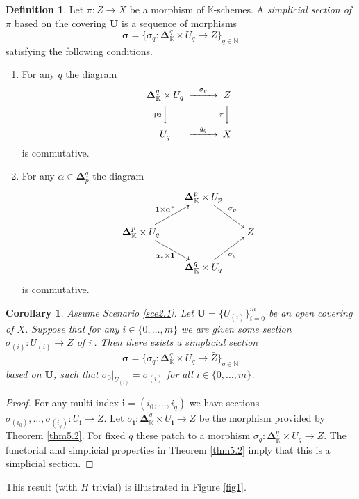 \documentclass[10pt]{amsart}
\newtheorem{cor}[equation]{Corollary}
\theoremstyle{definition}
\newtheorem{dfn}[equation]{Definition}
\numberwithin{equation}{section}
\newcommand{\rmitem}[1]{\item[\text{\textup{(#1)}}]}
\newcommand{\mrm}[1]{\mathrm{#1}}
\newcommand{\mbb}[1]{\mathbb{#1}}
\newcommand{\tup}[1]{\textup{#1}}
\newcommand{\bsym}[1]{\boldsymbol{#1}}
\newcommand{\K}{\mbb{K}}
\begin{document}
\begin{dfn} \label{dfn3.2}
Let $\pi : Z \to X$ be a morphism of $\K$-schemes.
A {\em simplicial section of 
$\pi$} based on the covering $\bsym{U}$ is a sequence of morphisms
\[ \bsym{\sigma} = \{ \sigma_q : 
\bsym{\Delta}^q_{\K} \times U_q \to Z \}_{q \in \mbb{N}}  \]
satisfying the following conditions.
\begin{enumerate}
\rmitem{i} For any $q$ the diagram
\[ \begin{CD}
\bsym{\Delta}^q_{\K} \times U_q @>{\sigma_q}>>
Z \\
@V{\mrm{p}_2}VV @V{\pi}VV \\
U_q @>{g_q}>> X 
\end{CD} \]
is commutative.
%
\rmitem{ii} For any $\alpha \in \bsym{\Delta}_p^q$
the diagram
\[ \UseTips \xymatrix @=4.5ex {
& \bsym{\Delta}^{p}_{\K} \times U_p
\ar[dr]^{\sigma_{p}} 
\\
\bsym{\Delta}^{p}_{\K} \times U_q
\ar[ur]^{\bsym{1} \times \alpha^*} 
\ar[dr]_{\alpha_* \times \bsym{1}} 
& & Z \\
& \bsym{\Delta}^{q}_{\K} \times U_q
\ar[ur]_{\sigma_{q}} 
} \]
is commutative.
\end{enumerate}
\end{dfn}

\begin{cor} \label{cor2.1}
Assume Scenario \tup{\ref{sce2.1}}.
Let $\bsym{U} = \{ U_{(i)} \}_{i=0}^m$ be an open covering
of $X$. Suppose that for any $i \in \{ 0, \ldots, m \}$ we are 
given some section 
$\sigma_{(i)} : U_{(i)} \to \bar{Z}$ of 
$\bar{\pi}$. Then there exists a simplicial section
\[ \bsym{\sigma} = \{ \sigma_q : 
\bsym{\Delta}^q_{\K} \times U_q \to \bar{Z} \}_{q \in \mbb{N}} \]
based on $\bsym{U}$, such that 
$\sigma_0|_{U_{(i)}} = \sigma_{(i)}$
for all $i \in \{ 0, \ldots, m \}$. 
\end{cor}

\begin{proof}
For any multi-index
$\bsym{i} = (i_0, \ldots, i_q)$ we have sections
$\sigma_{(i_0)}, \ldots, \sigma_{(i_q)} : U_{\bsym{i}} \to 
\bar{Z}$. 
Let
$\sigma_{\bsym{i}} : \bsym{\Delta}^q_{\K} \times U_{\bsym{i}} \to  
\bar{Z}$
be the morphism provided by Theorem \ref{thm5.2}. For fixed $q$ 
these patch to a morphism
$\sigma_q : \bsym{\Delta}^q_{\K} \times U_q \to \bar{Z}$.
The functorial and simplicial properties in Theorem \ref{thm5.2} 
imply that this is a simplicial section.
\end{proof}

This result (with $H$ trivial) is illustrated in Figure \ref{fig1}.
\end{document}
